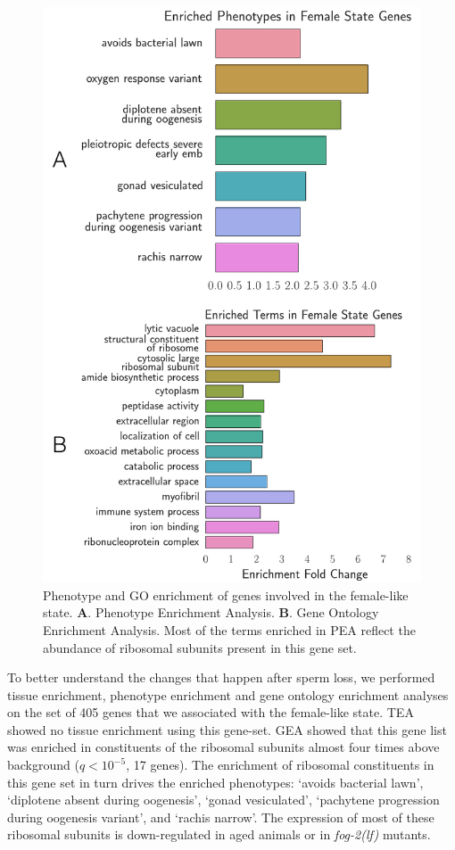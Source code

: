 \documentclass[9pt,twocolumn,twoside]{gsag3jnl}
\newcommand{\fog}{\emph{\mbox{fog-2(lf)}}}
\newcommand{\femalen}{405}
\begin{document}
\begin{figure}
  \renewcommand{\familydefault}{\sfdefault}\normalfont{}
  \centering
  \includegraphics[width=0.9\linewidth]
  {../../output/figs/final_figs/female_state_enrichment.pdf}
  \caption{
    Phenotype and GO enrichment of genes involved in the female-like state.
    \textbf{A}. Phenotype Enrichment Analysis.
    \textbf{B}. Gene Ontology Enrichment Analysis.
    Most of the terms enriched in PEA reflect the abundance of ribosomal subunits
    present in this gene set.
  }
\label{fig:female_state_enrich}
\end{figure}

To better understand the changes that happen after sperm loss, we performed
tissue enrichment, phenotype enrichment and gene ontology enrichment analyses on
the set of \femalen{} genes that we associated with the female-like state. TEA showed
no tissue enrichment using this gene-set. GEA showed that this gene list was
enriched in constituents of the ribosomal subunits almost four times above
background ($q<10^{-5}$, 17 genes). The enrichment of ribosomal constituents in
this gene set in turn drives the enriched phenotypes: `avoids bacterial lawn',
`diplotene absent during oogenesis', `gonad vesiculated', `pachytene progression
during oogenesis variant', and `rachis narrow'. The expression of most of these
ribosomal subunits is down-regulated in aged animals or in \fog{} mutants.
\end{document}
